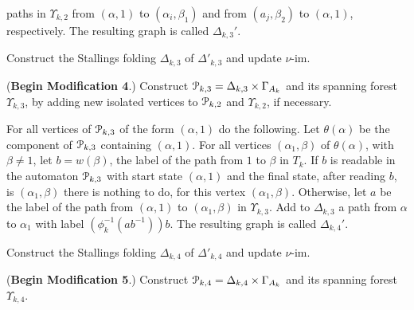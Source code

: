 \documentclass[a4paper,12pt]{article}
\renewcommand{\a}{\alpha }
\renewcommand{\b}{\beta }
\newcommand{\G}{\Gamma }
\newcommand{\D}{\Delta }
\newcommand{\U}{\Upsilon }
\newcommand{\cP}{{\cal{P}}}
\newcommand{\vim}{\nu\textrm{-im}}
\numberwithin{equation}{section}
\numberwithin{figure}{section}
\begin{document}
paths in $\U_{k,2}$ from $(\a,1)$ to $(\a_i,\b_1)$ and from $(a_j,\b_2)$ 
to $(\a,1)$,
respectively. The resulting graph is called  $\D_{k,3}'$.
\item\label{it:C10} Construct the Stallings folding $\D_{k,3}$ of 
$\D'_{k,3}$ and update $\vim$.
\item\label{it:C11} (\textbf{Begin Modification 4}.)
 Construct  $\cP_{k,3}=\D_{k,3}\times \G_{A_k}$ and its spanning
 forest $\U_{k,3}$, by adding new isolated vertices to $\cP_{k,2}$ and 
$\U_{k,2}$,
if necessary. 
\item\label{it:C12} For all vertices of $\cP_{k,3}$ of the 
form $(\a,1)$ do the following.
Let $\theta(\a)$ be the component of $\cP_{k,3}$ containing $(\a,1)$.
For all vertices $(\a_1,\b)$ of $\theta(\a)$, with $\b\neq 1$, let
$b=w(\b)$, the label of the path from $1$ to $\b$ in $T_k$. If
$b$ is readable in the automaton $\cP_{k,3}$ with start state $(\a,1)$ and
the final state, after reading $b$, is $(\a_1,\b)$ there is nothing to do,
for this vertex $(\a_1,\b)$. Otherwise, let $a$ be the label of the
path from $(\a,1)$ to $(\a_1,\b)$ in $\U_{k,3}$. Add to $\D_{k,3}$ a path from
$\a$ to $\a_1$ with label $(\phi_k^{-1}(ab^{-1}))b$.
The resulting graph is called $\D_{k,4}'$.
\item\label{it:C13} Construct the Stallings folding $\D_{k,4}$ of $\D'_{k,4}$ 
and update $\vim$.
\item\label{it:C14} (\textbf{Begin Modification 5}.)
Construct  $\cP_{k,4}=\D_{k,4}\times \G_{A_k}$ and its spanning
 forest $\U_{k,4}$. 
\end{document}
